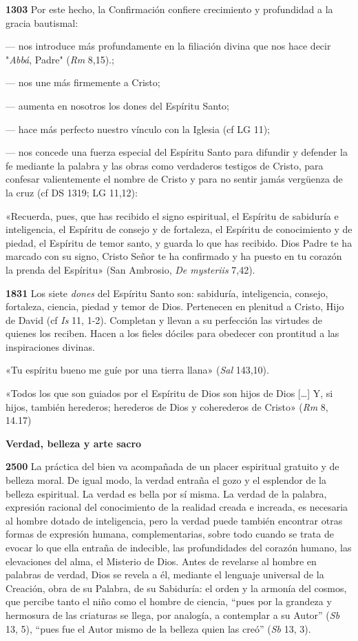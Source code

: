 \documentclass[]{article}
\begin{document}
\textbf{1303} Por este hecho, la Confirmación confiere crecimiento y
profundidad a la gracia bautismal:

--- nos introduce más profundamente en la filiación divina que nos hace
decir "\emph{Abbá}, Padre" (\emph{Rm} 8,15).;

--- nos une más firmemente a Cristo;

--- aumenta en nosotros los dones del Espíritu Santo;

--- hace más perfecto nuestro vínculo con la Iglesia (cf LG 11);

--- nos concede una fuerza especial del Espíritu Santo para difundir y
defender la fe mediante la palabra y las obras como verdaderos testigos
de Cristo, para confesar valientemente el nombre de Cristo y para no
sentir jamás vergüenza de la cruz (cf DS 1319; LG 11,12):

«Recuerda, pues, que has recibido el signo espiritual, el Espíritu de
sabiduría e inteligencia, el Espíritu de consejo y de fortaleza, el
Espíritu de conocimiento y de piedad, el Espíritu de temor santo, y
guarda lo que has recibido. Dios Padre te ha marcado con su signo,
Cristo Señor te ha confirmado y ha puesto en tu corazón la prenda del
Espíritu» (San Ambrosio, \emph{De mysteriis} 7,42).

\textbf{1831} Los siete \emph{dones} del Espíritu Santo son: sabiduría,
inteligencia, consejo, fortaleza, ciencia, piedad y temor de Dios.
Pertenecen en plenitud a Cristo, Hijo de David (cf \emph{Is} 11, 1-2).
Completan y llevan a su perfección las virtudes de quienes los reciben.
Hacen a los fieles dóciles para obedecer con prontitud a las
inspiraciones divinas.

«Tu espíritu bueno me guíe por una tierra llana» (\emph{Sal} 143,10).

«Todos los que son guiados por el Espíritu de Dios son hijos de Dios
[\ldots{}] Y, si hijos, también herederos; herederos de Dios y
coherederos de Cristo» (\emph{Rm} 8, 14.17)

\textbf{Verdad, belleza y arte sacro}

\textbf{2500} La práctica del bien va acompañada de un placer espiritual
gratuito y de belleza moral. De igual modo, la verdad entraña el gozo y
el esplendor de la belleza espiritual. La verdad es bella por sí misma.
La verdad de la palabra, expresión racional del conocimiento de la
realidad creada e increada, es necesaria al hombre dotado de
inteligencia, pero la verdad puede también encontrar otras formas de
expresión humana, complementarias, sobre todo cuando se trata de evocar
lo que ella entraña de indecible, las profundidades del corazón humano,
las elevaciones del alma, el Misterio de Dios. Antes de revelarse al
hombre en palabras de verdad, Dios se revela a él, mediante el lenguaje
universal de la Creación, obra de su Palabra, de su Sabiduría: el orden
y la armonía del cosmos, que percibe tanto el niño como el hombre de
ciencia, ``pues por la grandeza y hermosura de las criaturas se llega,
por analogía, a contemplar a su Autor'' (\emph{Sb} 13, 5), ``pues fue el
Autor mismo de la belleza quien las creó'' (\emph{Sb} 13, 3).
\end{document}
